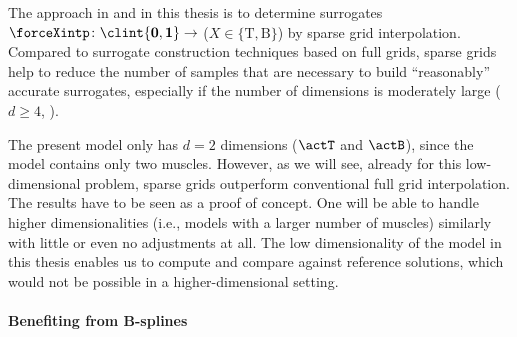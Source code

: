 The approach in \cite{Valentin18Gradient} and in this thesis is
to determine surrogates
$\forceXintp\colon \clint{\*0, \*1} \to \real$
($X \in \{\mathrm{T}, \mathrm{B}\}$) by sparse grid interpolation.
Compared to surrogate construction techniques based on full grids,
sparse grids help to reduce the number of samples that
are necessary to build ``reasonably'' accurate surrogates,
especially if the number of dimensions is moderately large
($d \ge 4$, ).

The present model only has $d = 2$ dimensions ($\actT$ and $\actB$),
since the model contains only two muscles.
However, as we will see,
already for this low-dimensional problem,
sparse grids outperform conventional full grid interpolation.
The results have to be seen as a proof of concept.
One will be able to handle higher dimensionalities
(i.e., models with a larger number of muscles) similarly with little
or even no adjustments at all.
The low dimensionality of the model in this thesis
enables us to compute and compare against reference solutions,
which would not be possible in a higher-dimensional setting.



\paragraph{Benefiting from B-splines}

